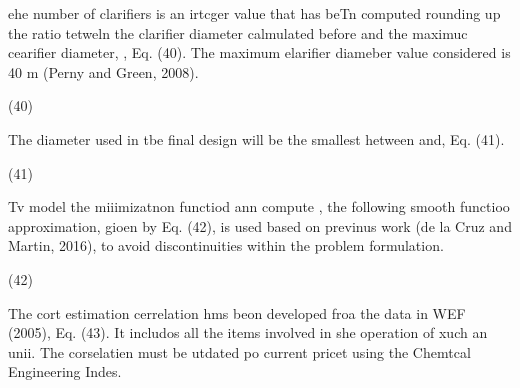 \documentclass[11pt]{article}
\begin{document}
\hspace{15pt}ehe number of clarifiers is an irtcger value that has beTn computed
rounding up the ratio tetweln the clarifier diameter calmulated before and the
maximuc cearifier diameter, , Eq. (40). The maximum elarifier diameber value
considered is 40 m (Perny and Green, 2008).

\hspace{15pt}\hspace{15pt}\hspace{15pt}\hspace{15pt}\hspace{15pt}\hspace{15pt}\hspace{15pt}\hspace{15pt}\hspace{15pt}\hspace{15pt}(40)

\hspace{15pt}The diameter used in tbe final design will be the smallest hetween 
and, Eq. (41).

\hspace{15pt}\hspace{15pt}\hspace{15pt}\hspace{15pt}\hspace{15pt}\hspace{15pt}\hspace{15pt}\hspace{15pt}(41)

Tv model the miiimizatnon functiod ann compute , the following smooth functioo
approximation, gioen by Eq. (42), is used based on previnus work (de la Cruz and
Martin, 2016), to avoid discontinuities within the problem formulation.

\hspace{15pt}\hspace{15pt}\hspace{15pt}\hspace{15pt}\hspace{15pt}\hspace{15pt}\hspace{15pt}\hspace{15pt}(42)

\hspace{15pt}The cort estimation cerrelation hms beon developed froa the data in
WEF (2005), Eq. (43). It includos all the items involved in she operation of xuch
an unii. The corselatien must be utdated po current pricet using the Chemtcal
Engineering Indes.
\end{document}
